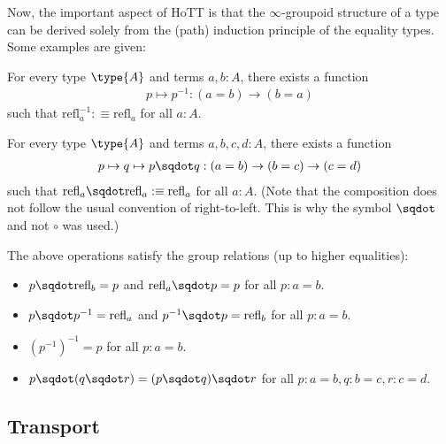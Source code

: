    Now, the important aspect of HoTT is that the $\infty$-groupoid structure of a type can be derived solely from the (path) induction principle of the equality types. Some examples are given:
    \begin{property}[Inversion]
        For every type $\type{A}$ and terms $a,b:A$, there exists a function
        \begin{gather}
            p\mapsto p^{-1}:(a=b)\rightarrow(b=a)
        \end{gather}
        such that $\mathrm{refl}_a^{-1}:\equiv\mathrm{refl}_a$ for all $a:A$.
    \end{property}
    \begin{property}[Concatenation]
        For every type $\type{A}$ and terms $a,b,c,d:A$, there exists a function
        \begin{gather}
            p\mapsto q\mapsto p\sqdot q:(a=b)\rightarrow(b=c)\rightarrow(c=d)
        \end{gather}
        such that $\mathrm{refl}_a\sqdot\mathrm{refl}_a:\equiv\mathrm{refl}_a$ for all $a:A$. (Note that the composition does not follow the usual convention of right-to-left. This is why the symbol $\sqdot$ and not $\circ$ was used.)
    \end{property}
    \begin{property}
        The above operations satisfy the group relations (up to higher equalities):
        \begin{itemize}
            \item $p\sqdot\mathrm{refl}_b=p$ and $\mathrm{refl}_a\sqdot p=p$ for all $p:a=b$.
            \item $p\sqdot p^{-1}=\mathrm{refl}_a$ and $p^{-1}\sqdot p=\mathrm{refl}_b$ for all $p:a=b$.
            \item $(p^{-1})^{-1}=p$ for all $p:a=b$.
            \item $p\sqdot(q\sqdot r) = (p\sqdot q)\sqdot r$ for all $p:a=b, q:b=c, r:c=d$.
        \end{itemize}
    \end{property}

\subsection{Transport}

